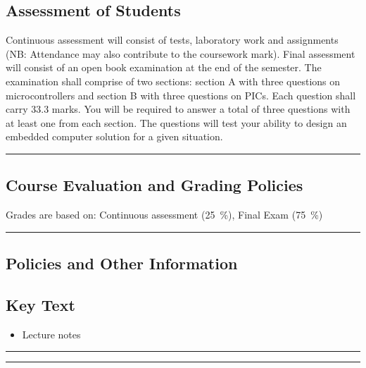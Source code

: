 \subsection*{Assessment of Students}
\begin{outline}
    \1 Continuous assessment will consist of tests, laboratory work and assignments (NB: Attendance may also contribute to the coursework mark).
    \1 Final assessment will consist of an open book examination at the end of the semester. The examination shall comprise of two sections: section A with three questions on microcontrollers and section B with three questions on PICs.  Each question shall carry 33.3 marks. You will be required to answer a total of three questions with at least one from each section. The questions will test your ability to design an embedded computer solution for a given situation.
\end{outline}
\vspace{2ex}\hrule\vspace{2ex}

\subsection*{Course Evaluation and Grading Policies}
Grades are based on:
Continuous assessment (\qty{25}{\percent}),
Final Exam (\qty{75}{\percent})
\vspace{2ex}\hrule\vspace{2ex}


\subsection*{Policies and Other Information}
\subsection*{Key Text}

\begin{itemize}
    \item Lecture notes
\end{itemize}
\vspace{2ex}\hrule
\vspace{2ex}\hrule\vspace{2ex}